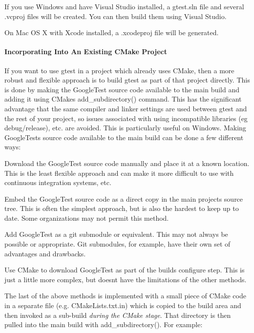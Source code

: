 If you use Windows and have Visual Studio installed, a {\ttfamily gtest.\+sln} file and several {\ttfamily .vcproj} files will be created. You can then build them using Visual Studio.

On Mac OS X with Xcode installed, a {\ttfamily .xcodeproj} file will be generated.

\paragraph*{Incorporating Into An Existing C\+Make Project}

If you want to use gtest in a project which already uses C\+Make, then a more robust and flexible approach is to build gtest as part of that project directly. This is done by making the Google\+Test source code available to the main build and adding it using C\+Make\textquotesingle{}s {\ttfamily add\+\_\+subdirectory()} command. This has the significant advantage that the same compiler and linker settings are used between gtest and the rest of your project, so issues associated with using incompatible libraries (eg debug/release), etc. are avoided. This is particularly useful on Windows. Making Google\+Test\textquotesingle{}s source code available to the main build can be done a few different ways\+:


\begin{DoxyItemize}
\item Download the Google\+Test source code manually and place it at a known location. This is the least flexible approach and can make it more difficult to use with continuous integration systems, etc.
\item Embed the Google\+Test source code as a direct copy in the main project\textquotesingle{}s source tree. This is often the simplest approach, but is also the hardest to keep up to date. Some organizations may not permit this method.
\item Add Google\+Test as a git submodule or equivalent. This may not always be possible or appropriate. Git submodules, for example, have their own set of advantages and drawbacks.
\item Use C\+Make to download Google\+Test as part of the build\textquotesingle{}s configure step. This is just a little more complex, but doesn\textquotesingle{}t have the limitations of the other methods.
\end{DoxyItemize}

The last of the above methods is implemented with a small piece of C\+Make code in a separate file (e.\+g. {\ttfamily C\+Make\+Lists.\+txt.\+in}) which is copied to the build area and then invoked as a sub-\/build {\itshape during the C\+Make stage}. That directory is then pulled into the main build with {\ttfamily add\+\_\+subdirectory()}. For example\+:

